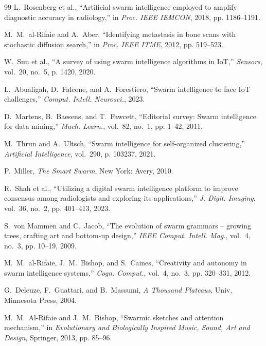 \documentclass[letterpaper, 10pt, conference]{IEEEtran}
\begin{document}
\begin{thebibliography}{99}
L.~Rosenberg et al., ``Artificial swarm intelligence employed to amplify diagnostic accuracy in radiology,'' in \emph{Proc. IEEE IEMCON}, 2018, pp. 1186--1191.

M.~M.~al-Rifaie and A.~Aber, ``Identifying metastasis in bone scans with stochastic diffusion search,'' in \emph{Proc. IEEE ITME}, 2012, pp. 519--523.

W.~Sun et al., ``A survey of using swarm intelligence algorithms in {IoT},'' \emph{Sensors}, vol.~20, no.~5, p. 1420, 2020.

L.~Abualigah, D.~Falcone, and A.~Forestiero, ``Swarm intelligence to face {IoT} challenges,'' \emph{Comput. Intell. Neurosci.}, 2023.

D.~Martens, B.~Baesens, and T.~Fawcett, ``Editorial survey: Swarm intelligence for data mining,'' \emph{Mach. Learn.}, vol.~82, no.~1, pp. 1--42, 2011.

M.~Thrun and A.~Ultsch, ``Swarm intelligence for self-organized clustering,'' \emph{Artificial Intelligence}, vol.~290, p. 103237, 2021.

P.~Miller, \emph{The Smart Swarm}, New York: Avery, 2010.

R.~Shah et al., ``Utilizing a digital swarm intelligence platform to improve consensus among radiologists and exploring its applications,'' \emph{J. Digit. Imaging}, vol.~36, no.~2, pp. 401--413, 2023.

S.~von Mammen and C.~Jacob, ``The evolution of swarm grammars -- growing trees, crafting art and bottom-up design,'' \emph{IEEE Comput. Intell. Mag.}, vol.~4, no.~3, pp. 10--19, 2009.

M.~M.~al-Rifaie, J.~M.~Bishop, and S.~Caines, ``Creativity and autonomy in swarm intelligence systems,'' \emph{Cogn. Comput.}, vol.~4, no.~3, pp. 320--331, 2012.

G.~Deleuze, F.~Guattari, and B.~Massumi, \emph{A Thousand Plateaus}, Univ. Minnesota Press, 2004.

M.~M.~Al-Rifaie and J.~M.~Bishop, ``Swarmic sketches and attention mechanism,'' in \emph{Evolutionary and Biologically Inspired Music, Sound, Art and Design}, Springer, 2013, pp. 85--96.

\end{thebibliography}
\end{document}
